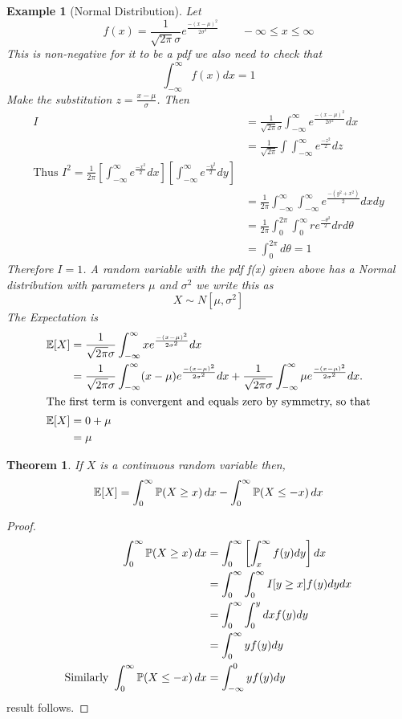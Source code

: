 \documentclass{notes}
\theoremstyle{plain}
\newtheorem{theorem}{Theorem}[chapter]
\newtheorem*{example}{Example}
\newcommand{\bP}{\mathbb{P}}
\newcommand{\bE}{\mathbb{E}}
\newcommand{\prob}[1]{\bP \negthinspace\left(#1\right)}
\newcommand{\expect}[1]{\bE\!\left[#1\right]}
\begin{document}
\begin{example}[Normal Distribution]
Let
\[
f(x) = \frac{1}{\sqrt{2\pi}\sigma} e^\frac{-(x-\mu)^2}{2\sigma^2}
\qquad -\infty \le x\le \infty
\]
This is non-negative for it to be a pdf we also need to check that
\[
\int_{-\infty}^{\infty} f(x) dx =1
\]
Make the substitution $ z = \frac{ x-\mu}{\sigma}$. Then
\begin{align*}
I &= \frac{1}{\sqrt{2\pi}\sigma} \int_{-\infty}^{\infty}
e^\frac{-(x-\mu)^2}{2\sigma^2}dx\\
&= \frac{1}{\sqrt{2\pi}}\int\int _{-\infty}^{\infty}e^\frac{-z^2}{2}dz\\
\text{Thus } I^2 =
\frac{1}{2\pi}\left[\int_{-\infty}^{\infty}e^\frac{-x^2}{2}dx
\right]\left[\int_{-\infty}^{\infty}e^\frac{-y^2}{2}dy \right]\\
&= \frac{1}{2\pi}\int_{-\infty}^{\infty}\int_{-\infty}^{\infty}
e^\frac{-(y^2+x^2)}{2}dxdy\\
&=\frac{1}{2\pi}\int_0^{2\pi}\int_0^{\infty}
  re^\frac{-\theta^2}{2}drd\theta\\
&= \int_0^{2\pi}d\theta = 1
\end{align*}
Therefore $I=1$. A random variable with the pdf f(x) given above has a
\emph{Normal distribution} with parameters $\mu$ and $\sigma^2$ we
write this as
\[
X\sim N[\mu,\sigma^2]
\]
The Expectation is
\begin{align*}
\expect{X} &=
\frac{1}{\sqrt{2\pi}\sigma}\int_{-\infty}^{\infty}xe^\frac{-(x-\mu)^2}{2\sigma^2}dx\\
&= \frac{1}{\sqrt{2\pi}\sigma}\int_{-\infty}^{\infty}
(x-\mu)e^\frac{-(x-\mu)^2}{2\sigma^2}dx +
\frac{1}{\sqrt{2\pi}\sigma}\int_{-\infty}^{\infty}\mu
e^\frac{-(x-\mu)^2}{2\sigma^2}dx. \\
\intertext{The first term is convergent and equals zero by symmetry, so that}
\expect{X} &= 0 + \mu\\
&= \mu
\end{align*}
\end{example}

\begin{theorem}
If $X$ is a continuous random variable then,
\[
\expect{X}= \int_{0}^{\infty} \prob{X \ge x} dx - 
\int_{0}^{\infty} \prob{X \le -x} dx
\]
\end{theorem}

\begin{proof}
\begin{align*}
\int_{0}^{\infty} \prob{X \ge x} dx  &= 
\int_{0}^{\infty}\left[\int_{x}^{\infty}f(y)dy \right]dx\\
&= \int_{0}^{\infty}\int_{0}^{\infty}I[y\ge x]f(y)dydx\\
&=\int_{0}^{\infty}\int_{0}^{y}dx f(y)dy\\
&= \int_{0}^{\infty}yf(y)dy\\
\text{Similarly } \int_{0}^{\infty} \prob{X \le -x} dx & =
\int_{-\infty}^{0} yf(y)dy
\end{align*}
result follows.
\end{proof}
\end{document}

